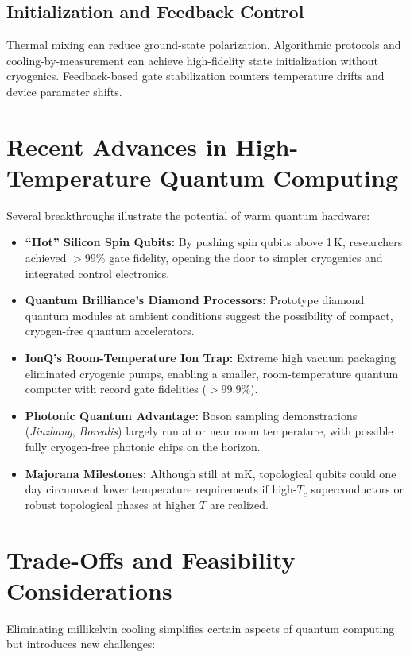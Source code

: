 \documentclass[11pt]{article}
\begin{document}
\subsection{Initialization and Feedback Control}
Thermal mixing can reduce ground-state polarization. Algorithmic protocols and cooling-by-measurement can achieve high-fidelity state initialization without cryogenics. Feedback-based gate stabilization counters temperature drifts and device parameter shifts.

\section{Recent Advances in High-Temperature Quantum Computing}

Several breakthroughs illustrate the potential of warm quantum hardware:

\begin{itemize}
\item \textbf{“Hot” Silicon Spin Qubits:} By pushing spin qubits above 1\,K, researchers achieved $>99\%$ gate fidelity, opening the door to simpler cryogenics and integrated control electronics. 
\item \textbf{Quantum Brilliance’s Diamond Processors:} Prototype diamond quantum modules at ambient conditions suggest the possibility of compact, cryogen-free quantum accelerators. 
\item \textbf{IonQ’s Room-Temperature Ion Trap:} Extreme high vacuum packaging eliminated cryogenic pumps, enabling a smaller, room-temperature quantum computer with record gate fidelities ($>99.9\%$). 
\item \textbf{Photonic Quantum Advantage:} Boson sampling demonstrations (\emph{Jiuzhang}, \emph{Borealis}) largely run at or near room temperature, with possible fully cryogen-free photonic chips on the horizon. 
\item \textbf{Majorana Milestones:} Although still at mK, topological qubits could one day circumvent lower temperature requirements if high-$T_c$ superconductors or robust topological phases at higher $T$ are realized.
\end{itemize}

\section{Trade-Offs and Feasibility Considerations}

Eliminating millikelvin cooling simplifies certain aspects of quantum computing but introduces new challenges:
\end{document}
